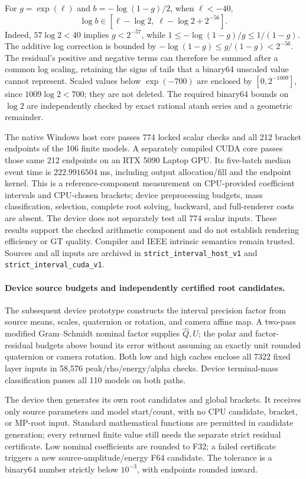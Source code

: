\documentclass[11pt,a4paper]{article}
\begin{document}
For $g=\exp(\ell)$ and $b=-\log(1-g)/2$, when $\ell<-40$,
\[
 \log b\in
 [\ell-\log2,\;\ell-\log2+2^{-56}].
\]
Indeed, $57\log2<40$ implies $g<2^{-57}$, while
$1\leq-\log(1-g)/g\leq1/(1-g)$. The additive log correction is bounded
by $-\log(1-g)\leq g/(1-g)<2^{-56}$.
The residual's positive and negative terms can therefore be summed after
a common log scaling, retaining the signs of tails that a binary64
unscaled value cannot represent. Scaled values below $\exp(-700)$ are
enclosed by $[0,2^{-1009}]$, since $1009\log2<700$; they are not deleted.
The required binary64 bounds on $\log2$ are independently checked by
exact rational atanh series and a geometric remainder.

The native Windows host core passes 774 locked scalar checks and all
212 bracket endpoints of the 106 finite models. A separately compiled
CUDA core passes those same 212 endpoints on an RTX 5090 Laptop GPU.
Its five-batch median event time is $222.9916504$ ms, including output
allocation/fill and the endpoint kernel. This is a reference-component
measurement on CPU-provided coefficient intervals and CPU-chosen
brackets; device preprocessing budgets, mass classification, selection,
complete root solving, backward, and full-renderer costs are absent.
The device does not separately test all 774 scalar inputs. These results
support the checked arithmetic component and do not establish rendering
efficiency or GT quality. Compiler and IEEE intrinsic semantics remain
trusted. Sources and all inputs are archived in
\texttt{strict\_interval\_host\_v1} and
\texttt{strict\_interval\_cuda\_v1}.

\paragraph{Device source budgets and independently certified root candidates.}
The subsequent device prototype constructs the interval precision factor
from source means, scales, quaternion or rotation, and camera affine map.
A two-pass modified Gram--Schmidt nominal factor supplies $\widehat Q,U$;
the polar and factor-residual budgets above bound its error without
assuming an exactly unit rounded quaternion or camera rotation.
Both low and high caches enclose all 7322 fixed layer inputs in
58,576 peak/rho/energy/alpha checks. Device terminal-mass classification
passes all 110 models on both paths.

The device then generates its own root candidates and global brackets.
It receives only source parameters and model start/count, with no CPU
candidate, bracket, or MP-root input. Standard mathematical functions
are permitted in candidate generation; every returned finite value
still needs the separate strict residual certificate. Low nominal
coefficients are rounded to F32; a failed certificate triggers a new
source-amplitude/energy F64 candidate. The tolerance is a binary64
number strictly below $10^{-3}$, with endpoints rounded inward.
\end{document}
